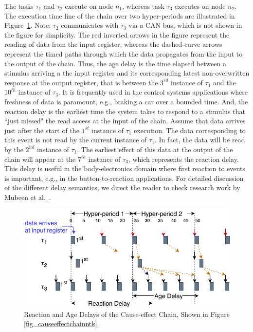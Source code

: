 {{The tasks $\tau_1$ and $\tau_2$ execute on node $n_1$, whereas task $\tau_3$ executes on node $n_2$. The execution time line of the chain over two hyper-periods are illustrated in Figure~\ref{fig_timedchainntk}. Note: $\tau_2$ communicates with $\tau_3$ via a CAN bus, which is not shown in the figure for simplicity. The red inverted arrows in the figure represent the reading of data from the input register, whereas the dashed-curve arrows represent the timed paths through which the data propagates from the input to the output of the chain. Thus, the age delay is the time elapsed between a stimulus arriving a the input register and its corresponding latest non-overwritten response at the output register, that is between the $3^{rd}$ instance of  $\tau_1$  and the $10^{th}$ instance of $\tau_3$. It is frequently used in the control systems applications where freshness of data is paramount, e.g., braking a car over a bounded time. And, the reaction delay is the earliest time the system takes to respond to a stimulus that ``just missed" the read access at the input of the chain. Assume that data arrives just after the start of the $1^{st}$ instance of $\tau_1$ execution. The data corresponding to this event is not read by the current instance of $\tau_1$. In fact, the data will be read by the $2^{nd}$ instance of $\tau_1$. The earliest effect of this data at the output of the chain will appear at the $7^{th}$ instance of $\tau_3$, which represents the reaction delay. This delay is useful in the body-electronics domain where first reaction to events is important, e.g., in the button-to-reaction applications. For detailed discussion of the different delay semantics, we direct the reader to check research work by Mubeen et al.~\cite{mubeen2013support}. 
\begin{figure}
	\centering
	\includegraphics[width=0.9\linewidth]{img/timedchain_ntk}
	\caption{Reaction and Age Delays of the Cause-effect Chain, Shown in Figure {\ref{fig_causeeffectchainntk}}.}
	\label{fig_timedchainntk}
\end{figure}

}}
